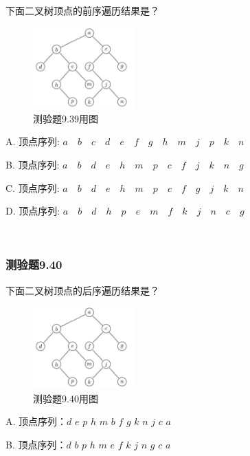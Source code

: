 \documentclass[UTF8, heading=true]{ctexart}
\begin{document}
下面二叉树顶点的前序遍历结果是？

\begin{figure}[H]
  \centering
  \includegraphics[width=0.35\textwidth]{9.37.jpg} %
  \caption{测验题9.39用图}
\end{figure}

A. 顶点序列: $a \quad b \quad c \quad d \quad e \quad f \quad g \quad h \quad m \quad j \quad p \quad k \quad n$

B. 顶点序列: $a \quad b \quad d \quad e \quad h \quad m \quad p \quad c \quad f \quad j \quad k \quad n \quad g$

C. 顶点序列: $a \quad b \quad d \quad e \quad h \quad m \quad p \quad c \quad f \quad g \quad j \quad k \quad n$

D. 顶点序列: $a \quad b \quad d \quad h \quad p \quad e \quad m \quad f \quad k \quad j \quad n \quad c \quad g$

\textcolor{white}{答案：B}

\subsubsection{测验题9.40}

下面二叉树顶点的后序遍历结果是？

\begin{figure}[H]
  \centering
  \includegraphics[width=0.35\textwidth]{9.37.jpg} %
  \caption{测验题9.40用图}
\end{figure}

A. 顶点序列：$d$ \quad $e$ \quad $p$ \quad $h$ \quad $m$ \quad $b$ \quad $f$ \quad $g$ \quad $k$ \quad $n$ \quad $j$ \quad $c$ \quad $a$

B. 顶点序列：$d$ \quad $b$ \quad $p$ \quad $h$ \quad $m$ \quad $e$ \quad $f$ \quad $k$ \quad $j$ \quad $n$ \quad $g$ \quad $c$ \quad $a$
\end{document}
